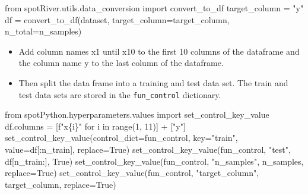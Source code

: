 \documentclass[
  letterpaper,
  DIV=11,
  numbers=noendperiod]{scrreprt}
\newenvironment{Shaded}{\begin{snugshade}}{\end{snugshade}}
\newcommand{\BuiltInTok}[1]{\textcolor[rgb]{0.00,0.23,0.31}{#1}}
\newcommand{\ControlFlowTok}[1]{\textcolor[rgb]{0.00,0.23,0.31}{#1}}
\newcommand{\DecValTok}[1]{\textcolor[rgb]{0.68,0.00,0.00}{#1}}
\newcommand{\ImportTok}[1]{\textcolor[rgb]{0.00,0.46,0.62}{#1}}
\newcommand{\KeywordTok}[1]{\textcolor[rgb]{0.00,0.23,0.31}{#1}}
\newcommand{\NormalTok}[1]{\textcolor[rgb]{0.00,0.23,0.31}{#1}}
\newcommand{\OperatorTok}[1]{\textcolor[rgb]{0.37,0.37,0.37}{#1}}
\newcommand{\SpecialCharTok}[1]{\textcolor[rgb]{0.37,0.37,0.37}{#1}}
\newcommand{\SpecialStringTok}[1]{\textcolor[rgb]{0.13,0.47,0.30}{#1}}
\newcommand{\StringTok}[1]{\textcolor[rgb]{0.13,0.47,0.30}{#1}}
\newcommand{\VariableTok}[1]{\textcolor[rgb]{0.07,0.07,0.07}{#1}}
\providecommand{\tightlist}{%
  \setlength{\itemsep}{0pt}\setlength{\parskip}{0pt}}\usepackage{longtable,booktabs,array}
\begin{document}
\begin{Shaded}
\begin{Highlighting}[]
\ImportTok{from}\NormalTok{ spotRiver.utils.data\_conversion }\ImportTok{import}\NormalTok{ convert\_to\_df}
\NormalTok{target\_column }\OperatorTok{=} \StringTok{"y"}
\NormalTok{df }\OperatorTok{=}\NormalTok{ convert\_to\_df(dataset, target\_column}\OperatorTok{=}\NormalTok{target\_column, n\_total}\OperatorTok{=}\NormalTok{n\_samples)}
\end{Highlighting}
\end{Shaded}

\begin{itemize}
\tightlist
\item
  Add column names x1 until x10 to the first 10 columns of the dataframe
  and the column name y to the last column of the dataframe.
\item
  Then split the data frame into a training and test data set. The train
  and test data sets are stored in the \texttt{fun\_control} dictionary.
\end{itemize}

\begin{Shaded}
\begin{Highlighting}[]
\ImportTok{from}\NormalTok{ spotPython.hyperparameters.values }\ImportTok{import}\NormalTok{ set\_control\_key\_value}
\NormalTok{df.columns }\OperatorTok{=}\NormalTok{ [}\SpecialStringTok{f"x}\SpecialCharTok{\{}\NormalTok{i}\SpecialCharTok{\}}\SpecialStringTok{"} \ControlFlowTok{for}\NormalTok{ i }\KeywordTok{in} \BuiltInTok{range}\NormalTok{(}\DecValTok{1}\NormalTok{, }\DecValTok{11}\NormalTok{)] }\OperatorTok{+}\NormalTok{ [}\StringTok{"y"}\NormalTok{]}
\NormalTok{set\_control\_key\_value(control\_dict}\OperatorTok{=}\NormalTok{fun\_control,}
\NormalTok{                        key}\OperatorTok{=}\StringTok{"train"}\NormalTok{,}
\NormalTok{                        value}\OperatorTok{=}\NormalTok{df[:n\_train],}
\NormalTok{                        replace}\OperatorTok{=}\VariableTok{True}\NormalTok{)}
\NormalTok{set\_control\_key\_value(fun\_control, }\StringTok{"test"}\NormalTok{, df[n\_train:], }\VariableTok{True}\NormalTok{)}
\NormalTok{set\_control\_key\_value(fun\_control, }\StringTok{"n\_samples"}\NormalTok{, n\_samples, replace}\OperatorTok{=}\VariableTok{True}\NormalTok{)}
\NormalTok{set\_control\_key\_value(fun\_control, }\StringTok{"target\_column"}\NormalTok{, target\_column, replace}\OperatorTok{=}\VariableTok{True}\NormalTok{)}
\end{Highlighting}
\end{Shaded}
\end{document}
